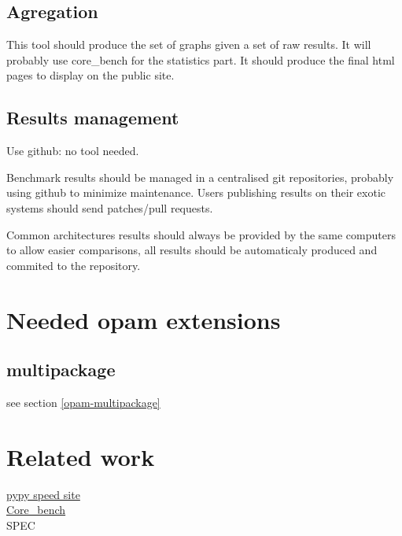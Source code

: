 \documentclass[11pt,a4paper]{article}
\begin{document}
\subsection{Agregation}

This tool should produce the set of graphs given a set of raw
results. It will probably use core\_bench for the statistics part. It
should produce the final html pages to display on the public site.

\subsection{Results management}

Use github: no tool needed.

Benchmark results should be managed in a centralised git repositories,
probably using github to minimize maintenance. Users publishing
results on their exotic systems should send patches/pull requests.

Common architectures results should always be provided by the same
computers to allow easier comparisons, all results should be
automaticaly produced and commited to the repository.

\section{Needed opam extensions}

\subsection{multipackage}
see section \ref{opam-multipackage}

\subsection{}

\section{Related work}

\href{http://speed.pypy.org/}{pypy speed site}\\
\href{https://github.com/janestreet/core_bench}{Core\_bench}\\
SPEC\\
\end{document}
